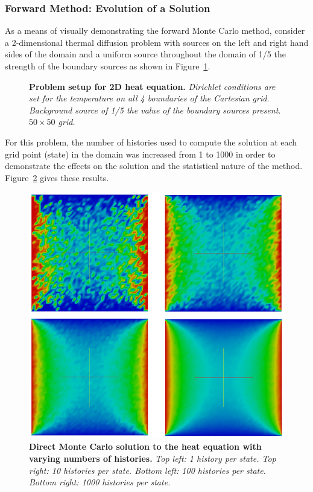 \subsubsection{Forward Method: Evolution of a Solution}
\label{subsec:direct_evolution}
As a means of visually demonstrating the forward Monte Carlo method,
consider a 2-dimensional thermal diffusion problem with sources on the
left and right hand sides of the domain and a uniform source
throughout the domain of 1/5 the strength of the boundary sources as
shown in Figure~\ref{fig:heat_setup}.
\begin{figure}[t!]
  \begin{center}
    \scalebox{1.2}{  }
  \end{center}
  \caption{\textbf{Problem setup for 2D heat equation.}
    \textit{Dirichlet conditions are set for the temperature on all 4
      boundaries of the Cartesian grid. Background source of 1/5 the
      value of the boundary sources present. $50 \times 50$ grid.}}
  \label{fig:heat_setup}
\end{figure}
For this problem, the number of histories used to compute the solution
at each grid point (state) in the domain was increased from 1 to 1000
in order to demonstrate the effects on the solution and the
statistical nature of the method. Figure~\ref{fig:direct_evolution}
gives these results.
\begin{figure}[t!]
  \begin{center}
    \includegraphics[width=6in]{chapters/mc_background/direct_evolution.png}
  \end{center}
  \caption{\textbf{Direct Monte Carlo solution to the heat equation
      with varying numbers of histories.} \textit{Top left: 1 history
      per state. Top right: 10 histories per state. Bottom left: 100
      histories per state. Bottom right: 1000 histories per state.}}
  \label{fig:direct_evolution}
\end{figure}

